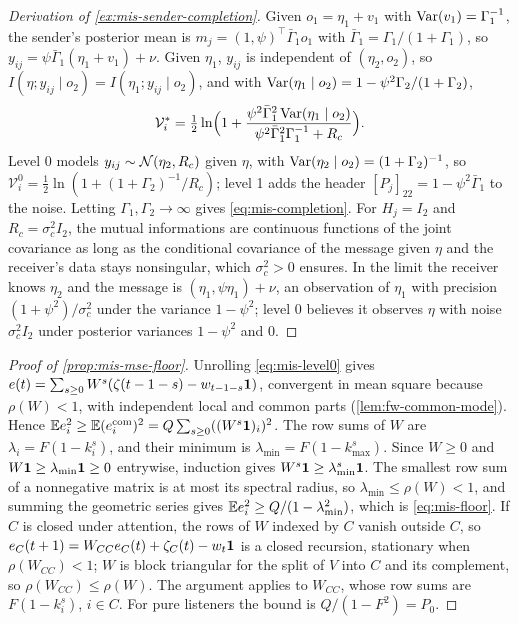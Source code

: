 \begin{proof}[Derivation of \cref{ex:mis-sender-completion}]
Given $o_1=\eta_1+v_1$ with $\operatorname{Var}(v_1)=\Gamma_1^{-1}$, the sender's posterior mean is $m_j=(1,\psi)^\top\bar\Gamma_1o_1$ with $\bar\Gamma_1=\Gamma_1/(1+\Gamma_1)$, so $y_{ij}=\psi\bar\Gamma_1(\eta_1+v_1)+\nu$. Given $\eta_1$, $y_{ij}$ is independent of $(\eta_2,o_2)$, so $I(\eta;y_{ij}\mid o_2)=I(\eta_1;y_{ij}\mid o_2)$, and with $\operatorname{Var}(\eta_1\mid o_2)=1-\psi^2\Gamma_2/(1+\Gamma_2)$,
\begin{equation*}
\mathcal V^\ast_i=\tfrac12\ln\Bigl(1+\frac{\psi^2\bar\Gamma_1^2\operatorname{Var}(\eta_1\mid o_2)}{\psi^2\bar\Gamma_1^2\Gamma_1^{-1}+R_c}\Bigr).
\end{equation*}
Level 0 models $y_{ij}\sim\mathcal{N}(\eta_2,R_c)$ given $\eta$, with $\operatorname{Var}(\eta_2\mid o_2)=(1+\Gamma_2)^{-1}$, so $\mathcal V^0_i=\tfrac12\ln(1+(1+\Gamma_2)^{-1}/R_c)$; level 1 adds the header $[P_j]_{22}=1-\psi^2\bar\Gamma_1$ to the noise. Letting $\Gamma_1,\Gamma_2\to\infty$ gives \eqref{eq:mis-completion}. For $H_j=I_2$ and $R_c=\sigma_c^2I_2$, the mutual informations are continuous functions of the joint covariance as long as the conditional covariance of the message given $\eta$ and the receiver's data stays nonsingular, which $\sigma_c^2>0$ ensures. In the limit the receiver knows $\eta_2$ and the message is $(\eta_1,\psi\eta_1)+\nu$, an observation of $\eta_1$ with precision $(1+\psi^2)/\sigma_c^2$ under the variance $1-\psi^2$; level 0 believes it observes $\eta$ with noise $\sigma_c^2I_2$ under posterior variances $1-\psi^2$ and $0$.
\end{proof}

\begin{proof}[Proof of \cref{prop:mis-mse-floor}]
Unrolling \eqref{eq:mis-level0} gives $e(t)=\sum_{s\ge0}W^s(\zeta(t-1-s)-w_{t-1-s}\mathbf{1})$, convergent in mean square because $\rho(W)<1$, with independent local and common parts (\cref{lem:fw-common-mode}). Hence $\mathbb{E} e_i^2\ge\mathbb{E}(e^{\mathrm{com}}_i)^2=Q\sum_{s\ge0}((W^s\mathbf{1})_i)^2$. The row sums of $W$ are $\lambda_i=F(1-k^s_i)$, and their minimum is $\lambda_{\min}=F(1-k^s_{\max})$. Since $W\ge0$ and $W\mathbf{1}\ge\lambda_{\min}\mathbf{1}\ge0$ entrywise, induction gives $W^s\mathbf{1}\ge\lambda_{\min}^s\mathbf{1}$. The smallest row sum of a nonnegative matrix is at most its spectral radius, so $\lambda_{\min}\le\rho(W)<1$, and summing the geometric series gives $\mathbb{E} e_i^2\ge Q/(1-\lambda_{\min}^2)$, which is \eqref{eq:mis-floor}. If $C$ is closed under attention, the rows of $W$ indexed by $C$ vanish outside $C$, so $e_C(t+1)=W_{CC}e_C(t)+\zeta_C(t)-w_t\mathbf{1}$ is a closed recursion, stationary when $\rho(W_{CC})<1$; $W$ is block triangular for the split of $V$ into $C$ and its complement, so $\rho(W_{CC})\le\rho(W)$. The argument applies to $W_{CC}$, whose row sums are $F(1-k^s_i)$, $i\in C$. For pure listeners the bound is $Q/(1-F^2)=P_0$.
\end{proof}


